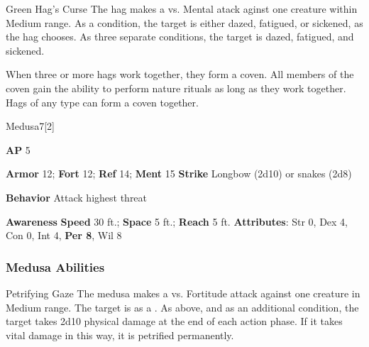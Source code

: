 \vspace{0.5em}
\begin{freeability}{Green Hag's Curse}
The hag makes a  vs. Mental atack aginst one creature within Medium range.
\hit As a condition, the target is either dazed, fatigued, or sickened, as the hag chooses.
\crit As three separate conditions, the target is dazed, fatigued, and sickened.
\end{freeability}

When three or more hags work together, they form a coven.
All members of the coven gain the ability to perform nature rituals as long as they work together.
Hags of any type can form a coven together.

\begin{monsection}{Medusa}{7}[2]
\vspace{-1em}\vspace{-1em}
\begin{spellcontent}
\begin{spelltargetinginfo}
{\textbf{AP} 5}

\pari \textbf{Armor} 12;
\textbf{Fort} 12;
\textbf{Ref} 14;
\textbf{Ment} 15
\pari \textbf{Strike} Longbow  (2d10) or snakes  (2d8)



\pari \textbf{Behavior} Attack highest threat
\end{spelltargetinginfo}
\end{spellcontent}

\begin{monsterfooter}
\pari \textbf{Awareness} 
\pari \textbf{Speed} 30 ft.;
\textbf{Space} 5 ft.;
\textbf{Reach} 5 ft.
\pari \textbf{Attributes}:
Str 0,
Dex 4,
Con 0,
Int 4,
\textbf{Per 8},
Wil 8
\end{monsterfooter}
\end{monsection}


\subsubsection{Medusa Abilities}

\begin{freeability}{Petrifying Gaze}
The medusa makes a  vs. Fortitude attack against one creature in Medium range.
\hit The target is  as a .
\crit As above, and as an additional condition, the target takes 2d10 physical damage at the end of each action phase.
If it takes vital damage in this way, it is petrified permanently.
\end{freeability}

